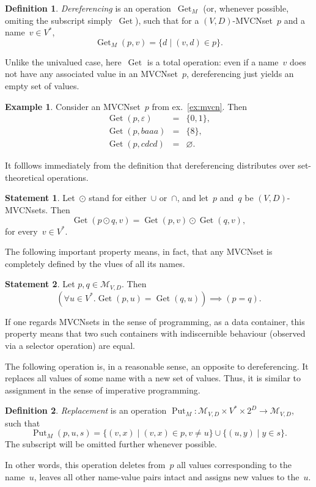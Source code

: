 \documentclass{article}
\theoremstyle{definition}
\newtheorem{Df}{Definition}
\newtheorem{St}{Statement}
\newtheorem{Ex}{Example}
\newcommand{\setcharmvcn}{M}
\newcommand{\setsymbol}[3]{\mathcal{#1}_{#2,#3}}
\newcommand{\setmvcn}[2]{\setsymbol{\setcharmvcn}{#1}{#2}}
\newcommand{\deref}{\operatorname{Get}}
\newcommand{\putval}{\operatorname{Put}}
\begin{document}
\begin{Df}\label{df:mvcn-dereferencing}
\emph{Dereferencing} is an operation~$\deref_\setcharmvcn$ (or, whenever
possible, omiting the subscript simply~$\deref$), such that for
a $(V,D)$-MVCNset~$p$ and a name~$v\in V^\ast$,
\[
  \deref_\setcharmvcn(p, v) = \{ d \mid (v, d) \in p \} .
\]
\end{Df}

Unlike the univalued case, here~$\deref$ is a total operation: even if a
name~$v$ does not have any associated value in an MVCNset~$p$, dereferencing
just yields an empty set of values.

\begin{Ex}\label{ex:mvcn-dereferencing}
Consider an MVCNset~$p$ from ex.~\ref{ex:mvcn}. Then
\begin{eqnarray*}
  \deref(p, \varepsilon) & = & \{ 0, 1 \}, \\
  \deref(p, baaa)        & = & \{ 8 \}, \\
  \deref(p, cdcd)        & = & \varnothing .
\end{eqnarray*}

\end{Ex}

It folllows immediately from the definition that dereferencing distributes
over set-theoretical operations.
\begin{St}\label{st:mvcn-deref-distributivity}
Let~$\odot$ stand for either~$\cup$ or~$\cap$, and let~$p$ and~$q$ be
$(V,D)$-MVCNsets. Then
\[
  \deref(p\odot q, v) = \deref(p, v) \odot \deref(q, v) ,
\]
for every~$v\in V^\ast$.
\end{St}

The following important property means, in fact, that any MVCNset is completely
defined by the vlues of all its names.
\begin{St}\label{st:mvcn-deref-equality}
Let $p, q \in \setmvcn{V}{D}$. Then
\[
  (\forall u\in V^\ast . \deref(p,u) = \deref(q,u)) \implies (p = q) .
\]
\end{St}
If one regards MVCNsets in the sense of programming, as a data container, this
property means that two such containers with indiscernible behaviour
(observed via a selector operation) are equal.

The following operation is, in a reasonable sense, an opposite to
dereferencing.  It replaces all values of some name with a new set of values.
Thus, it is similar to assignment in the sense of imperative programming.
\begin{Df}\label{df:mvcn-replace}
\emph{Replacement} is an operation $\putval_\setcharmvcn : \setmvcn{V}{D}
\times V^\ast \times 2^D \to \setmvcn{V}{D}$, such that
\[
  \putval_\setcharmvcn(p, u, s) =
      \{ (v, x) \mid (v, x) \in p, v \neq u \} \cup
      \{ (u, y) \mid y \in s \} .
\]
The subscript will be omitted further whenever possible.
\end{Df}
In other words, this operation deletes from~$p$ all values corresponding to
the name~$u$, leaves all other name-value pairs intact and assigns new values
to the~$u$.
\end{document}
